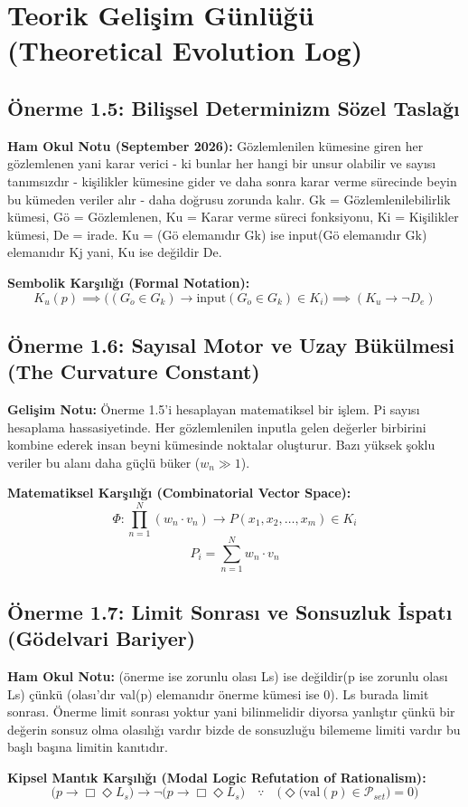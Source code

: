 \section{Teorik Gelişim Günlüğü (Theoretical Evolution Log)}

\subsection{Önerme 1.5: Bilişsel Determinizm Sözel Taslağı}
\textbf{Ham Okul Notu (September 2026):} 
Gözlemlenilen kümesine giren her gözlemlenen yani karar verici - ki bunlar her hangi bir unsur olabilir ve sayısı tanımsızdır - kişilikler kümesine gider ve daha sonra karar verme sürecinde beyin bu kümeden veriler alır - daha doğrusu zorunda kalır.
Gk = Gözlemlenilebilirlik kümesi, Gö = Gözlemlenen, Ku = Karar verme süreci fonksiyonu, Ki = Kişilikler kümesi, De = irade.
Ku = (Gö elemanıdır Gk) ise input(Gö elemanıdır Gk) elemanıdır Kj yani, Ku ise değildir De.

\textbf{Sembolik Karşılığı (Formal Notation):}
\[ K_u(p) \implies \Big( (G_{\ddot{o}} \in G_k) \rightarrow \text{input}(G_{\ddot{o}} \in G_k) \in K_i \Big) \implies (K_u \rightarrow \neg D_e) \]

\subsection{Önerme 1.6: Sayısal Motor ve Uzay Bükülmesi (The Curvature Constant)}
\textbf{Gelişim Notu:} Önerme 1.5'i hesaplayan matematiksel bir işlem. Pi sayısı hesaplama hassasiyetinde. Her gözlemlenilen inputla gelen değerler birbirini kombine ederek insan beyni kümesinde noktalar oluşturur. Bazı yüksek şoklu veriler bu alanı daha güçlü büker ($w_n \gg 1$).

\textbf{Matematiksel Karşılığı (Combinatorial Vector Space):}
\[ \Phi: \prod_{n=1}^{N} (w_n \cdot v_n) \longrightarrow P(x_1, x_2, \dots, x_m) \in K_i \]
\[ P_i = \sum_{n=1}^{N} w_n \cdot v_n \]

\subsection{Önerme 1.7: Limit Sonrası ve Sonsuzluk İspatı (Gödelvari Bariyer)}
\textbf{Ham Okul Notu:} (önerme ise zorunlu olası Ls) ise değildir(p ise zorunlu olası Ls) çünkü (olası'dır val(p) elemanıdır önerme kümesi ise 0). Ls burada limit sonrası. Önerme limit sonrası yoktur yani bilinmelidir diyorsa yanlıştır çünkü bir değerin sonsuz olma olasılığı vardır bizde de sonsuzluğu bilememe limiti vardır bu başlı başına limitin kanıtıdır.

\textbf{Kipsel Mantık Karşılığı (Modal Logic Refutation of Rationalism):}
\[ \Big( p \rightarrow \Box \Diamond L_s \Big) \rightarrow \neg \Big( p \rightarrow \Box \Diamond L_s \Big) \quad \because \quad \Big( \Diamond \big( \text{val}(p) \in \mathcal{P}_{set} \big) = 0 \Big) \]
